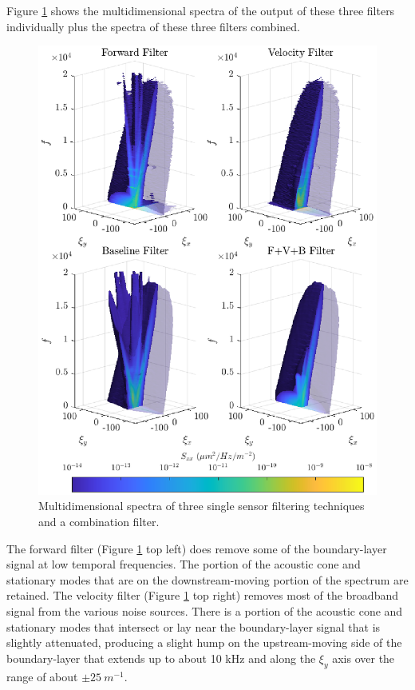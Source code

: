 Figure \ref{fig:08_dispersion_filters} shows the multidimensional spectra of the output of these three filters individually plus the spectra of these three filters combined.
\begin{figure}
  \centering
  \includegraphics{../matlab/08_conclusion/dispersion_filters.eps}
  \caption{Multidimensional spectra of three single sensor filtering techniques and a combination filter.}
  \label{fig:08_dispersion_filters}
\end{figure}
The forward filter (Figure \ref{fig:08_dispersion_filters} top left) does remove some of the boundary-layer signal at low temporal frequencies.
The portion of the acoustic cone and stationary modes that are on the downstream-moving portion of the spectrum are retained.
The velocity filter (Figure \ref{fig:08_dispersion_filters} top right) removes most of the broadband signal from the various noise sources.
There is a portion of the acoustic cone and stationary modes that intersect or lay near the boundary-layer signal that is slightly attenuated, producing a slight hump on the upstream-moving side of the boundary-layer that extends up to about 10 kHz and along the $\xi_y$ axis over the range of about $\pm25\ m^{-1}$.

